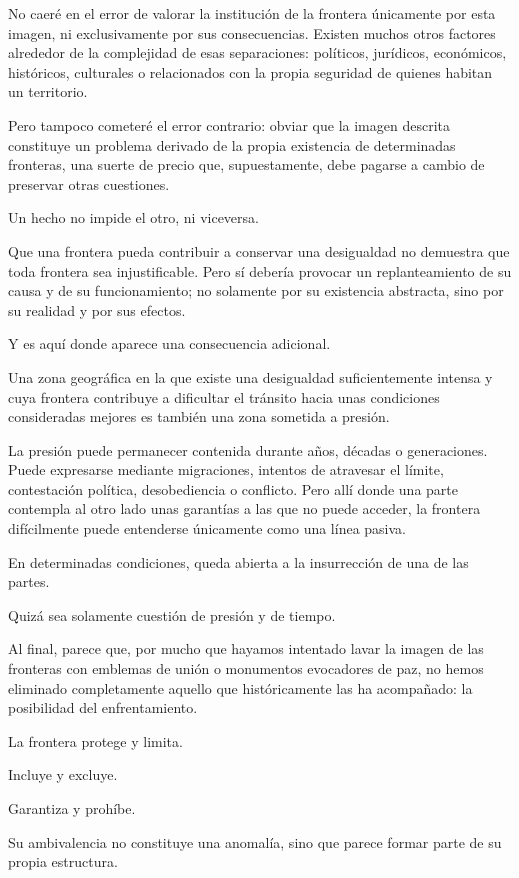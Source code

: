 \documentclass[12pt,a4paper]{article}
\begin{document}
No caeré en el error de valorar la institución de la frontera únicamente por esta imagen, ni exclusivamente por sus consecuencias. Existen muchos otros factores alrededor de la complejidad de esas separaciones: políticos, jurídicos, económicos, históricos, culturales o relacionados con la propia seguridad de quienes habitan un territorio.

Pero tampoco cometeré el error contrario: obviar que la imagen descrita constituye un problema derivado de la propia existencia de determinadas fronteras, una suerte de precio que, supuestamente, debe pagarse a cambio de preservar otras cuestiones.

Un hecho no impide el otro, ni viceversa.

Que una frontera pueda contribuir a conservar una desigualdad no demuestra que toda frontera sea injustificable. Pero sí debería provocar un replanteamiento de su causa y de su funcionamiento; no solamente por su existencia abstracta, sino por su realidad y por sus efectos.

Y es aquí donde aparece una consecuencia adicional.

Una zona geográfica en la que existe una desigualdad suficientemente intensa y cuya frontera contribuye a dificultar el tránsito hacia unas condiciones consideradas mejores es también una zona sometida a presión.

La presión puede permanecer contenida durante años, décadas o generaciones. Puede expresarse mediante migraciones, intentos de atravesar el límite, contestación política, desobediencia o conflicto. Pero allí donde una parte contempla al otro lado unas garantías a las que no puede acceder, la frontera difícilmente puede entenderse únicamente como una línea pasiva.

En determinadas condiciones, queda abierta a la insurrección de una de las partes.

Quizá sea solamente cuestión de presión y de tiempo.

Al final, parece que, por mucho que hayamos intentado lavar la imagen de las fronteras con emblemas de unión o monumentos evocadores de paz, no hemos eliminado completamente aquello que históricamente las ha acompañado: la posibilidad del enfrentamiento.

La frontera protege y limita.

Incluye y excluye.

Garantiza y prohíbe.

Su ambivalencia no constituye una anomalía, sino que parece formar parte de su propia estructura.
\end{document}
